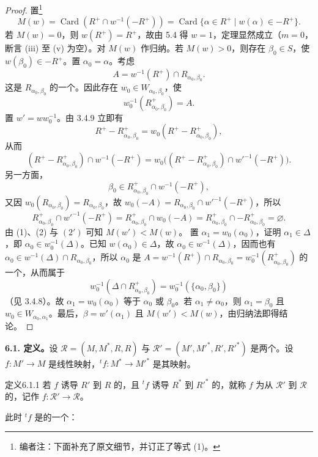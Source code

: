 \begin{proof}
置\footnote{编者注：下面补充了原文细节，并订正了等式 (1)。}
\[M(w)=\operatorname{Card}(R^+\cap w^{-1}(-R^+))
=\operatorname{Card}\{\alpha\in R^+\mid w(\alpha)\in-R^+\}.\]
若 $M(w)=0$，则 $w(R^+)=R^+$，故由 5.4 得 $w=1$，定理显然成立（$m=0$，断言 (iii) 至 (v) 为空）。对 $M(w)$ 作归纳。若 $M(w)>0$，则存在 $\beta_0\in S$，使 $w(\beta_0)\in-R^+$。置 $\alpha_0=\alpha$。考虑
\[A=w^{-1}(R^+)\cap R_{\alpha_0,\beta_0}.\]
这是 $R_{\alpha_0,\beta_0}$ 的一个。因此存在 $w_0\in W_{\alpha_0,\beta_0}$，使
\[w_0^{-1}(R_{\alpha_0,\beta_0}^+)=A.\]
置 $w'=ww_0^{-1}$。由 3.4.9 立即有
\[R^+-R_{\alpha_0,\beta_0}^+=w_0(R^+-R_{\alpha_0,\beta_0}^+),\]
从而
\[(R^+-R_{\alpha_0,\beta_0}^+)\cap w^{-1}(-R^+)
=w_0\bigl((R^+-R_{\alpha_0,\beta_0}^+)\cap w'^{-1}(-R^+)\bigr).\tag{1}\]
另一方面，
\[\beta_0\in R_{\alpha_0,\beta_0}^+\cap w^{-1}(-R^+),\tag{2}\]
又因 $w_0(R_{\alpha_0,\beta_0})=R_{\alpha_0,\beta_0}$，故 $w_0(-A)=R_{\alpha_0,\beta_0}\cap w'^{-1}(-R^+)$，所以
\[R_{\alpha_0,\beta_0}^+\cap w'^{-1}(-R^+)
=R_{\alpha_0,\beta_0}^+\cap w_0(-A)
=R_{\alpha_0,\beta_0}^+\cap -R_{\alpha_0,\beta_0}^+=\varnothing.\tag{$2'$}\]
由 (1)、(2) 与 $(2')$ 可知 $M(w')<M(w)$。
置 $\alpha_1=w_0(\alpha_0)$，证明 $\alpha_1\in\Delta$，即 $\alpha_0\in w_0^{-1}(\Delta)$。已知 $w(\alpha_0)\in\Delta$，故 $\alpha_0\in w^{-1}(\Delta)$，因而也有 $\alpha_0\in w^{-1}(\Delta)\cap R_{\alpha_0,\beta_0}$，所以 $\alpha_0$ 是 $A=w^{-1}(R^+)\cap R_{\alpha_0,\beta_0}=w_0^{-1}(R_{\alpha_0,\beta_0}^+)$ 的一个，从而属于
\[w_0^{-1}(\Delta\cap R_{\alpha_0,\beta_0}^+)=w_0^{-1}(\{\alpha_0,\beta_0\})\]
（见 3.4.8）。故 $\alpha_1=w_0(\alpha_0)$ 等于 $\alpha_0$ 或 $\beta_0$。若 $\alpha_1\ne\alpha_0$，则 $\alpha_1=\beta_0$ 且 $w_0\in W_{\alpha_0,\alpha_1}$。最后，$\beta=w'(\alpha_1)$ 且 $M(w')<M(w)$，由归纳法即得结论。
\end{proof}
\textbf{6.1. 定义。}设 $\mathscr R=(M,M^*,R,R)$ 与 $\mathscr R'=(M',M'^*,R',R'^*)$ 是两个。设 $f:M'\to M$ 是线性映射，${}^tf:M^*\to M'^*$ 是其映射。
\begin{SGAresult}{定义}{6.1.1}
若 $f$ 诱导 $R'$ 到 $R$ 的，且 ${}^tf$ 诱导 $R^*$ 到 $R'^*$ 的，就称 $f$ 为从 $\mathscr R'$ 到 $\mathscr R$ 的，记作 $f:\mathscr R'\to\mathscr R$。
\end{SGAresult}
此时 ${}^tf$ 是的一个：

